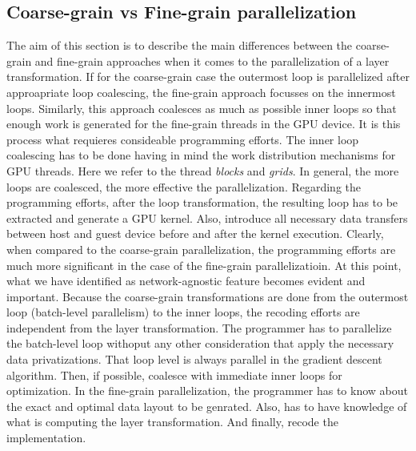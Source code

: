 \subsection{Coarse-grain vs Fine-grain parallelization}
The aim of this section is to describe the main differences between 
the coarse-grain and fine-grain approaches when it comes to the 
parallelization of a layer transformation. If for the coarse-grain 
case the outermost loop is parallelized after approapriate loop 
coalescing, the fine-grain approach focusses on the innermost loops.
Similarly, this approach coalesces as much as possible inner loops 
so that enough work is generated for the fine-grain threads in 
the GPU device. It is this process what requieres consideable programming 
efforts. The inner loop coalescing has to be done having in mind the 
work distribution mechanisms for GPU threads. Here we refer to the 
thread \emph{blocks} and \emph{grids}. In general, the more loops 
are coalesced, the more effective the parallelization. Regarding the 
programming efforts, after the loop transformation, the resulting loop 
has to be extracted and generate a GPU kernel. Also, introduce all 
necessary data transfers between host and guest device before and after 
the kernel execution. Clearly, when compared to the coarse-grain 
parallelization, the programming efforts are much more significant in 
the case of the fine-grain parallelizatioin. At this point, what we 
have identified as network-agnostic feature becomes evident and 
important. Because the coarse-grain transformations are done from 
the outermost loop (batch-level parallelism) to the inner loops, 
the recoding efforts are independent from the layer 
transformation. The programmer has to parallelize 
the batch-level loop withoput any other consideration that apply 
the necessary data privatizations. That loop level is always 
parallel in the gradient descent algorithm. Then, if possible, 
coalesce with immediate inner loops for optimization. In the fine-grain 
parallelization, the programmer has to know about the exact and 
optimal data layout to be genrated. Also, has to have knowledge of 
what is computing the layer transformation. And finally, recode 
the implementation.



